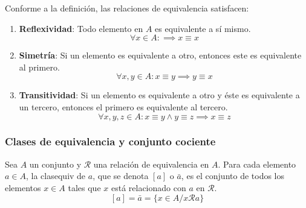 Conforme a la definición, las relaciones de equivalencia satisfacen:

\begin{enumerate}[label=\roman*)]
	\item \textbf{Reflexividad}: Todo elemento en $A$ es equivalente a sí mismo.
	\[ \forall x \in A: \implies x \equiv x \]
	
	\item \textbf{Simetría}: Si un elemento es equivalente a otro, entonces este es equivalente al primero.
	\[ \forall x, y \in A: x \equiv y \implies y \equiv x \]
	
	\item \textbf{Transitividad}: Si un elemento es equivalente a otro y éste es equivalente a un tercero, entonces el primero es equivalente al tercero.
	\[ \forall x, y, z \in A: x \equiv y \land y \equiv z \implies x \equiv z \]
\end{enumerate}

\subsubsection{Clases de equivalencia y conjunto cociente}
\vspace{3mm} 
\begin{fmd-definition}
	Sea $A$ un conjunto y $\mathcal{R}$ una relación de equivalencia en $A$. Para cada elemento $a \in A$, la \gls{clasequiv} de $a$, que se denota $[a]$ o $\bar{a}$, es el conjunto de todos los elementos $x \in A$ tales que $x$ está relacionado con $a$ en $\mathcal{R}$.
	\[ [a] = \bar{a} = \{ x \in A / x \mathcal{R} a \}\]
\end{fmd-definition}

